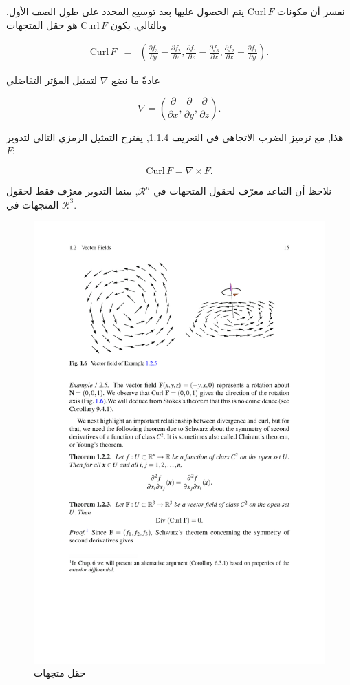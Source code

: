 نفسر أن مكونات \( \text{Curl} \, F \) يتم الحصول عليها بعد توسيع المحدد على طول الصف الأول. وبالتالي, يكون \( \text{Curl} \, F \) هو حقل المتجهات

\begin{eqnarray*}
    \text{Curl} \, F &=& \left( \frac{\partial f_3}{\partial y} - \frac{\partial f_2}{\partial z}, \frac{\partial f_1}{\partial z} - \frac{\partial f_3}{\partial x}, \frac{\partial f_2}{\partial x} - \frac{\partial f_1}{\partial y} \right).
\end{eqnarray*}

عادةً ما نضع \( \nabla \) لتمثيل المؤثر التفاضلي

\[ \nabla = \left( \frac{\partial}{\partial x}, \frac{\partial}{\partial y}, \frac{\partial}{\partial z} \right). \]

هذا, مع ترميز الضرب الاتجاهي في التعريف 1.1.4, يقترح التمثيل الرمزي التالي لتدوير \( F \):

\[ \text{Curl} \, F = \nabla \times F. \]

نلاحظ أن التباعد معرّف لحقول المتجهات في \( \mathcal{R}^n \), بينما التدوير معرّف فقط لحقول المتجهات في \( \mathcal{R}^3 \).

\begin{figure}
    \centering
    \includegraphics[width=0.8\linewidth]{Vector field Example.pdf}
    \caption{حقل متجهات}
    \label{fig:enter-label}
\end{figure}

